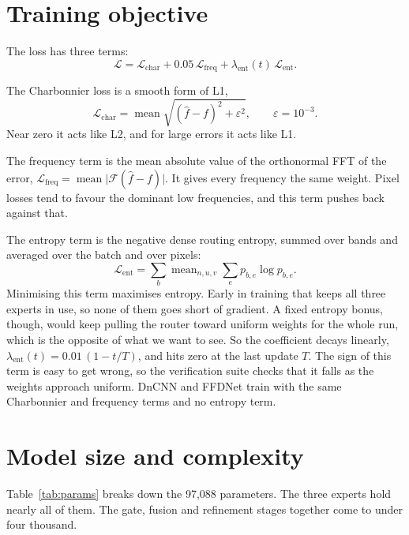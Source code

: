 \section{Training objective}\label{sec:loss}

The loss has three terms:
\begin{equation}
	\mathcal{L} = \mathcal{L}_\text{char}
	+ 0.05\,\mathcal{L}_\text{freq}
	+ \lambda_\text{ent}(t)\,\mathcal{L}_\text{ent}.
	\label{eq:loss}
\end{equation}

The Charbonnier loss \cite{charbonnier1994} is a smooth form of L1,
\begin{equation}
	\mathcal{L}_\text{char} = \operatorname{mean}\sqrt{(\hat f - f)^2 + \varepsilon^2},
	\qquad \varepsilon = 10^{-3}.
\end{equation}
Near zero it acts like L2, and for large errors it acts like L1.

The frequency term is the mean absolute value of the orthonormal FFT of the
error, $\mathcal{L}_\text{freq} = \operatorname{mean}\lvert
\mathcal{F}(\hat f - f)\rvert$. It gives every frequency the same weight.
Pixel losses tend to favour the dominant low frequencies, and this term
pushes back against that.

The entropy term is the negative dense routing entropy, summed over bands and
averaged over the batch and over pixels:
\begin{equation}
	\mathcal{L}_\text{ent} = \sum_b \operatorname{mean}_{n,u,v}\sum_e p_{b,e}\log p_{b,e}.
\end{equation}
Minimising this term maximises entropy. Early in training that keeps all
three experts in use, so none of them goes short of gradient. A fixed entropy
bonus, though, would keep pulling the router toward uniform weights for the
whole run, which is the opposite of what we want to see. So the coefficient
decays linearly, $\lambda_\text{ent}(t) = 0.01\,(1 - t/T)$, and hits zero at
the last update $T$. The sign of this term is easy to get wrong, so the
verification suite checks that it falls as the weights approach uniform.
DnCNN and FFDNet train with the same Charbonnier and frequency terms and no
entropy term.

\section{Model size and complexity}\label{sec:size}

Table~\ref{tab:params} breaks down the 97,088 parameters. The three experts
hold nearly all of them. The gate, fusion and refinement stages together come
to under four thousand.


